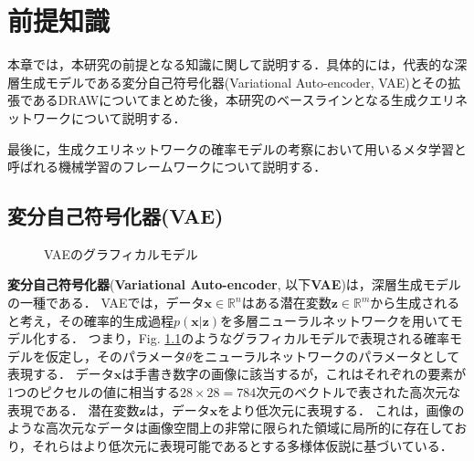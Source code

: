 \chapter{前提知識}
\label{chap:prerequisite}
本章では，本研究の前提となる知識に関して説明する．具体的には，代表的な深層生成モデルである変分自己符号化器(Variational Auto-encoder, VAE)とその拡張であるDRAWについてまとめた後，本研究のベースラインとなる生成クエリネットワークについて説明する．

最後に，生成クエリネットワークの確率モデルの考察において用いるメタ学習と呼ばれる機械学習のフレームワークについて説明する．

\section{変分自己符号化器(VAE)}
\label{section:VAE}

\begin{figure}[tbp]
\begin{center}
\caption{VAEのグラフィカルモデル}
\label{fig:gm_vae}
\end{center}
\end{figure}

{\bf 変分自己符号化器}({\bf Variational Auto-encoder}, 以下{\bf VAE})\cite{vae}は，深層生成モデルの一種である．
VAEでは，データ$\bm{x} \in \mathbb{R}^n$はある潜在変数$\bm{z} \in \mathbb{R}^m$から生成されると考え，その確率的生成過程$p(\bm{x}|\bm{z})$を多層ニューラルネットワークを用いてモデル化する．
つまり，Fig. \ref{fig:gm_vae}のようなグラフィカルモデルで表現される確率モデルを仮定し，そのパラメータ$\theta$をニューラルネットワークのパラメータとして表現する．
データ$\bm{x}$は手書き数字の画像に該当するが，これはそれぞれの要素が1つのピクセルの値に相当する$28\times28=784$次元のベクトルで表された高次元な表現である．
潜在変数$\bm{z}$は，データ$\bm{x}$をより低次元に表現する．
これは，画像のような高次元なデータは画像空間上の非常に限られた領域に局所的に存在しており，それらはより低次元に表現可能であるとする多様体仮説に基づいている．

